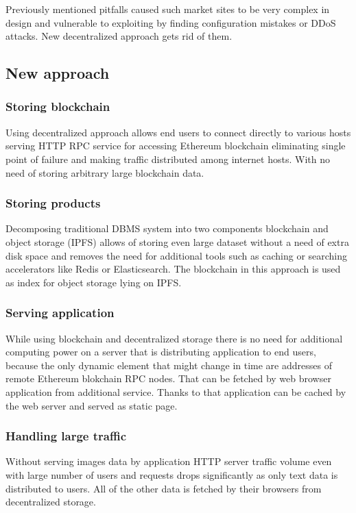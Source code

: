 \documentclass[journal]{IEEEtran} %
\begin{document}
        Previously mentioned pitfalls caused such market sites to be very complex in design and vulnerable to exploiting by finding configuration mistakes or DDoS attacks. New decentralized approach gets rid of them.
        
    \subsection{New approach}
        \subsubsection{Storing blockchain}
            Using decentralized approach allows end users to connect directly to various hosts serving HTTP RPC service for accessing Ethereum blockchain eliminating single point of failure and making traffic distributed among internet hosts. With no need of storing arbitrary large blockchain data.\\
            
        
        \subsubsection{Storing products}
            Decomposing traditional DBMS system into two components blockchain and object storage (IPFS) allows of storing even large dataset without a need of extra disk space and removes the need for additional tools such as caching or searching accelerators like Redis or Elasticsearch. The blockchain in this approach is used as index for object storage lying on IPFS.\\
            
        \subsubsection{Serving application}
            While using blockchain and decentralized storage there is no need for additional computing power on a server that is distributing application to end users, because the only dynamic element that might change in time are addresses of remote Ethereum blokchain RPC nodes. That can be fetched by web browser application from additional service. Thanks to that application can be cached by the web server and served as static page.\\
        
        \subsubsection{Handling large traffic}
            Without serving images data by application HTTP server traffic volume even with large number of users and requests drops significantly as only text data is distributed to users. All of the other data is fetched by their browsers from decentralized storage.
            
\end{document}
